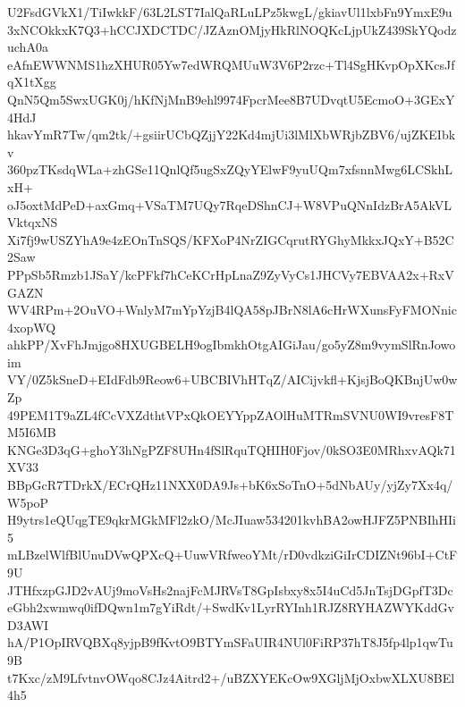 U2FsdGVkX1/TiIwkkF/63L2LST7IalQaRLuLPz5kwgL/gkiavUl1lxbFn9YmxE9u
3xNCOkkxK7Q3+hCCJXDCTDC/JZAznOMjyHkRlNOQKcLjpUkZ439SkYQodzuchA0a
eAfnEWWNMS1hzXHUR05Yw7edWRQMUuW3V6P2rzc+Tl4SgHKvpOpXKcsJfqX1tXgg
QnN5Qm5SwxUGK0j/hKfNjMnB9ehl9974FpcrMee8B7UDvqtU5EcmoO+3GExY4HdJ
hkavYmR7Tw/qm2tk/+gsiirUCbQZjjY22Kd4mjUi3lMlXbWRjbZBV6/ujZKEIbkv
360pzTKsdqWLa+zhGSe11QnlQf5ugSxZQyYElwF9yuUQm7xfsnnMwg6LCSkhLxH+
oJ5oxtMdPeD+axGmq+VSaTM7UQy7RqeDShnCJ+W8VPuQNnIdzBrA5AkVLVktqxNS
Xi7fj9wUSZYhA9e4zEOnTnSQS/KFXoP4NrZIGCqrutRYGhyMkkxJQxY+B52C2Saw
PPpSb5Rmzb1JSaY/kcPFkf7hCeKCrHpLnaZ9ZyVyCs1JHCVy7EBVAA2x+RxVGAZN
WV4RPm+2OuVO+WnlyM7mYpYzjB4lQA58pJBrN8lA6cHrWXunsFyFMONnic4xopWQ
ahkPP/XvFhJmjgo8HXUGBELH9ogIbmkhOtgAIGiJau/go5yZ8m9vymSlRnJowoim
VY/0Z5kSneD+EIdFdb9Reow6+UBCBIVhHTqZ/AICijvkfl+KjsjBoQKBnjUw0wZp
49PEM1T9aZL4fCcVXZdthtVPxQkOEYYppZAOlHuMTRmSVNU0WI9vresF8TM5I6MB
KNGe3D3qG+ghoY3hNgPZF8UHn4fSlRquTQHIH0Fjov/0kSO3E0MRhxvAQk71XV33
BBpGcR7TDrkX/ECrQHz11NXX0DA9Js+bK6xSoTnO+5dNbAUy/yjZy7Xx4q/W5poP
H9ytrs1eQUqgTE9qkrMGkMFl2zkO/McJIuaw534201kvhBA2owHJFZ5PNBIhHIi5
mLBzelWlfBlUnuDVwQPXcQ+UuwVRfweoYMt/rD0vdkziGiIrCDIZNt96bI+CtF9U
JTHfxzpGJD2vAUj9moVsHs2najFcMJRVsT8GpIsbxy8x5I4uCd5JnTsjDGpfT3Dc
eGbh2xwmwq0ifDQwn1m7gYiRdt/+SwdKv1LyrRYInh1RJZ8RYHAZWYKddGvD3AWI
hA/P1OpIRVQBXq8yjpB9fKvtO9BTYmSFaUIR4NUl0FiRP37hT8J5fp4lp1qwTu9B
t7Kxc/zM9LfvtnvOWqo8CJz4Aitrd2+/uBZXYEKcOw9XGljMjOxbwXLXU8BEl4h5
